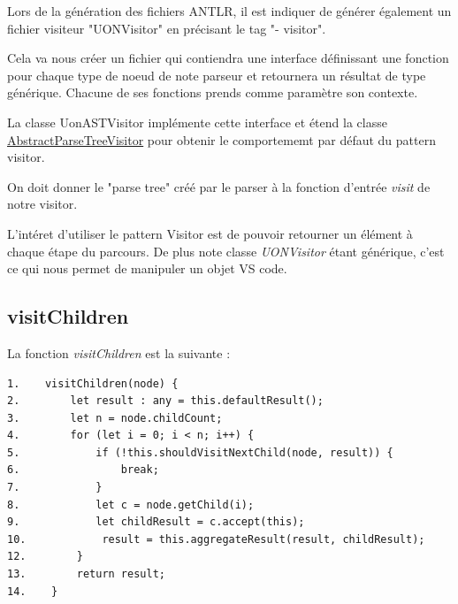 \documentclass[
    iict, %
    il, %
]{heig-tb}
\begin{document}
Lors de la génération des fichiers ANTLR, il est indiquer de générer également un fichier visiteur "UONVisitor" en précisant le tag "- visitor".

Cela va nous créer un fichier qui contiendra une interface définissant une fonction pour chaque type de noeud de note parseur et retournera un résultat de type générique.
Chacune de ses fonctions prends comme paramètre son contexte.


La classe UonASTVisitor implémente cette interface et étend la classe \href{https://www.antlr.org/api/Java/org/antlr/v4/runtime/tree/AbstractParseTreeVisitor.html}{AbstractParseTreeVisitor}
pour obtenir le comportememt par défaut du pattern visitor.

On doit donner le "parse tree" créé par le parser à la fonction d'entrée \emph{visit} de notre visitor. %

L'intéret d'utiliser le pattern Visitor est de pouvoir retourner un élément à chaque étape du parcours.
De plus note classe \emph{UONVisitor} étant générique, c'est ce qui nous permet de manipuler un objet VS code.



\subsection{visitChildren}

La fonction \emph{visitChildren} est la suivante :

\begin{lstlisting}
1.    visitChildren(node) {
2.        let result : any = this.defaultResult();
3.        let n = node.childCount;
4.        for (let i = 0; i < n; i++) {
5.            if (!this.shouldVisitNextChild(node, result)) {
6.                break;
7.            }
8.            let c = node.getChild(i);
9.            let childResult = c.accept(this);
10.            result = this.aggregateResult(result, childResult);
12.        }
13.        return result;
14.    }
\end{lstlisting}
\end{document}
